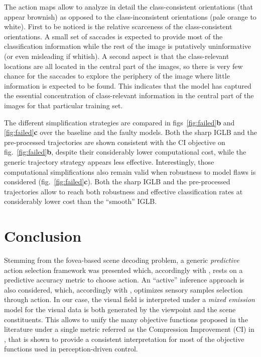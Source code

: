 \documentclass[12pt,twoside,openright]{article}
\begin{document}
The action maps allow to analyze in detail the class-consistent orientations (that appear brownish) as opposed to the class-inconsistent orientations (pale orange to white). First to be noticed is the relative scarceness of the class-consistent orientations. 
A small set of saccades is expected to provide most of the classification information while the rest of the image is putatively uninformative (or even misleading if whitish). A second aspect is that the class-relevant locations are all located in the central part of the images, so there is very few chance for the saccades to explore the periphery of the image where little information is expected to be found. This indicates that the model has captured the essential concentration of class-relevant information in the central part of the images for that particular training set.

The different simplification strategies are compared in figs~\ref{fig:failed}\textbf{b} and \ref{fig:failed}\textbf{c} over the baseline and the faulty models. Both the sharp IGLB and the pre-processed trajectories are shown consistent with the CI objective on fig.~\ref{fig:failed}\textbf{b}, despite their considerably lower computational cost, while the generic trajectory strategy appears less effective. Interestingly, those computational simplifications also remain valid when robustness to model flaws is considered (fig.~\ref{fig:failed}\textbf{c}). 
Both the sharp IGLB and the pre-processed trajectories allow to reach both robustness and effective classification rates at considerably lower cost than the ``smooth'' IGLB.


\section{Conclusion}
Stemming from the fovea-based scene decoding problem, a generic \emph{predictive} action selection framework was presented which, accordingly with \citep{najemnik2005optimal}, rests on a predictive accuracy metric to choose action. An ``active'' inference approach is also considered, which, accordingly with \citep{friston2012perceptions}, optimizes sensory samples selection through action. In our case, the visual field is interpreted under a \emph{mixed emission} model for the visual data is both generated by the viewpoint and the scene constituents. 
This allows to unify the many objective functions proposed in the literature under a single metric referred as the Compression Improvement (CI) in \citep{schmidhuber2007simple}, that is shown to provide a consistent interpretation for most of the objective functions used in perception-driven control. 
\end{document}
